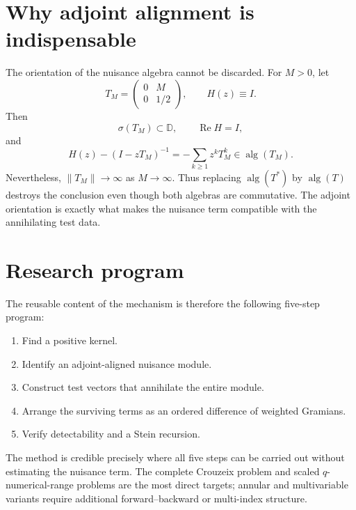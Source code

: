 \documentclass[11pt]{article}
\newcommand{\D}{\mathbb D}
\newcommand{\RePart}{\operatorname{Re}}
\newcommand{\alg}{\operatorname{alg}}
\begin{document}
\section{Why adjoint alignment is indispensable}

The orientation of the nuisance algebra cannot be discarded.  For
$M>0$, let
\begin{equation}
 T_M=\begin{pmatrix}0&M\\0&1/2\end{pmatrix},
 \qquad H(z)\equiv I.
 \label{eq:orientation-counterexample}
\end{equation}
Then
\begin{equation}
 \sigma(T_M)\subset\D,
 \qquad \RePart H=I,
 \label{eq:counterexample-positive}
\end{equation}
and
\begin{equation}
 H(z)-(I-zT_M)^{-1}
 =-\sum_{k\geq1}z^kT_M^k
 \in\alg(T_M).
 \label{eq:wrong-algebra-membership}
\end{equation}
Nevertheless, \(\|T_M\|\to\infty\) as $M\to\infty$.  Thus replacing
\(\alg(T^*)\) by \(\alg(T)\) destroys the conclusion even though both
algebras are commutative.  The adjoint orientation is exactly what
makes the nuisance term compatible with the annihilating test data.

\section{Research program}

The reusable content of the mechanism is therefore the following
five-step program:
\begin{enumerate}
 \item Find a positive kernel.
 \item Identify an adjoint-aligned nuisance module.
 \item Construct test vectors that annihilate the entire module.
 \item Arrange the surviving terms as an ordered difference of
       weighted Gramians.
 \item Verify detectability and a Stein recursion.
\end{enumerate}
The method is credible precisely where all five steps can be carried
out without estimating the nuisance term.  The complete Crouzeix
problem and scaled $q$-numerical-range problems are the most direct
targets; annular and multivariable variants require additional
forward--backward or multi-index structure.
\end{document}

